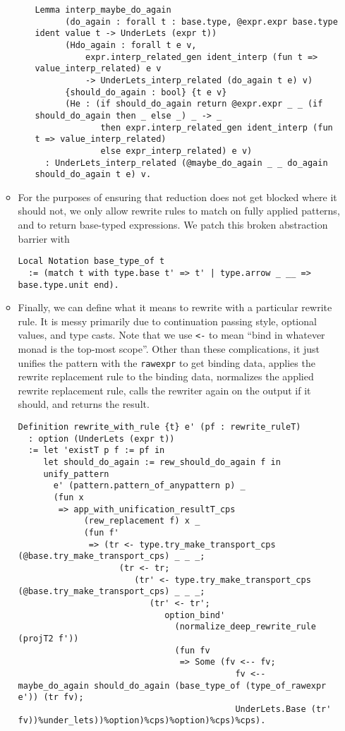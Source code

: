 \begin{itemize}
\begin{itemize}
\begin{itemize}
\begin{verbatim}
Lemma interp_maybe_do_again
      (do_again : forall t : base.type, @expr.expr base.type ident value t -> UnderLets (expr t))
      (Hdo_again : forall t e v,
          expr.interp_related_gen ident_interp (fun t => value_interp_related) e v
          -> UnderLets_interp_related (do_again t e) v)
      {should_do_again : bool} {t e v}
      (He : (if should_do_again return @expr.expr _ _ (if should_do_again then _ else _) _ -> _
             then expr.interp_related_gen ident_interp (fun t => value_interp_related)
             else expr_interp_related) e v)
  : UnderLets_interp_related (@maybe_do_again _ _ do_again should_do_again t e) v.
\end{verbatim}
    \end{itemize}
  \item
    For the purposes of ensuring that reduction does not get blocked
    where it should not, we only allow rewrite rules to match on fully
    applied patterns, and to return base-typed expressions. We patch
    this broken abstraction barrier with

\begin{verbatim}
Local Notation base_type_of t
  := (match t with type.base t' => t' | type.arrow _ __ => base.type.unit end).
\end{verbatim}
  \item
    Finally, we can define what it means to rewrite with a particular
    rewrite rule. It is messy primarily due to continuation passing
    style, optional values, and type casts. Note that we use
    \texttt{\textless{}-} to mean ``bind in whatever monad is the
    top-most scope''. Other than these complications, it just unifies
    the pattern with the \texttt{rawexpr} to get binding data, applies
    the rewrite replacement rule to the binding data, normalizes the
    applied rewrite replacement rule, calls the rewriter again on the
    output if it should, and returns the result.

\begin{verbatim}
Definition rewrite_with_rule {t} e' (pf : rewrite_ruleT)
  : option (UnderLets (expr t))
  := let 'existT p f := pf in
     let should_do_again := rew_should_do_again f in
     unify_pattern
       e' (pattern.pattern_of_anypattern p) _
       (fun x
        => app_with_unification_resultT_cps
             (rew_replacement f) x _
             (fun f'
              => (tr <- type.try_make_transport_cps (@base.try_make_transport_cps) _ _ _;
                    (tr <- tr;
                       (tr' <- type.try_make_transport_cps (@base.try_make_transport_cps) _ _ _;
                          (tr' <- tr';
                             option_bind'
                               (normalize_deep_rewrite_rule (projT2 f'))
                               (fun fv
                                => Some (fv <-- fv;
                                           fv <-- maybe_do_again should_do_again (base_type_of (type_of_rawexpr e')) (tr fv);
                                           UnderLets.Base (tr' fv))%under_lets))%option)%cps)%option)%cps)%cps).
\end{verbatim}


\end{itemize}
\end{itemize}
